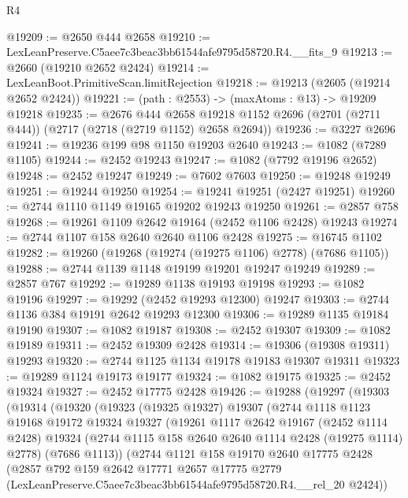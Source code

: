 \begin{lexlean}{R4}
\begin{coremodule}
@19209 := @2650 @444 @2658
@19210 := LexLeanPreserve.C5aee7c3beac3bb61544afe9795d58720.R4.__fits_9
@19213 := @2660 (@19210 @2652 @2424)
@19214 := LexLeanBoot.PrimitiveScan.limitRejection
@19218 := @19213 (@2605 (@19214 @2652 @2424))
@19221 := (path : @2553) -> (maxAtoms : @13) -> @19209 @19218
@19235 := @2676
    @444
    @2658
    @19218
    @1152
    @2696
    (@2701 (@2711 @444))
    (@2717 (@2718 (@2719 @1152) @2658 @2694))
@19236 := @3227 @2696
@19241 := @19236 @199 @98 @1150 @19203 @2640
@19243 := @1082 (@7289 @1105)
@19244 := @2452 @19243
@19247 := @1082 (@7792 @19196 @2652)
@19248 := @2452 @19247
@19249 := @7602 @7603
@19250 := @19248 @19249
@19251 := @19244 @19250
@19254 := @19241 @19251 (@2427 @19251)
@19260 := @2744 @1110 @1149 @19165 @19202 @19243 @19250
@19261 := @2857 @758
@19268 := @19261 @1109 @2642 @19164 (@2452 @1106 @2428) @19243
@19274 := @2744 @1107 @158 @2640 @2640 @1106 @2428
@19275 := @16745 @1102
@19282 := @19260 (@19268 (@19274 (@19275 @1106) @2778) (@7686 @1105))
@19288 := @2744 @1139 @1148 @19199 @19201 @19247 @19249
@19289 := @2857 @767
@19292 := @19289 @1138 @19193 @19198
@19293 := @1082 @19196
@19297 := @19292 (@2452 @19293 @12300) @19247
@19303 := @2744 @1136 @384 @19191 @2642 @19293 @12300
@19306 := @19289 @1135 @19184 @19190
@19307 := @1082 @19187
@19308 := @2452 @19307
@19309 := @1082 @19189
@19311 := @2452 @19309 @2428
@19314 := @19306 (@19308 @19311) @19293
@19320 := @2744 @1125 @1134 @19178 @19183 @19307 @19311
@19323 := @19289 @1124 @19173 @19177
@19324 := @1082 @19175
@19325 := @2452 @19324
@19327 := @2452 @17775 @2428
@19426 := @19288
    (@19297
      (@19303
        (@19314
          (@19320
            (@19323
              (@19325 @19327)
              @19307
              (@2744
                @1118
                @1123
                @19168
                @19172
                @19324
                @19327
                (@19261
                  @1117
                  @2642
                  @19167
                  (@2452 @1114 @2428)
                  @19324
                  (@2744 @1115 @158 @2640 @2640 @1114 @2428 (@19275 @1114) @2778)
                  (@7686 @1113))
                (@2744
                  @1121
                  @158
                  @19170
                  @2640
                  @17775
                  @2428
                  (@2857
                    @792
                    @159
                    @2642
                    @17771
                    @2657
                    @17775
                    @2779
                    (LexLeanPreserve.C5aee7c3beac3bb61544afe9795d58720.R4.__rel_20 @2424))

\end{coremodule}
\end{lexlean}
